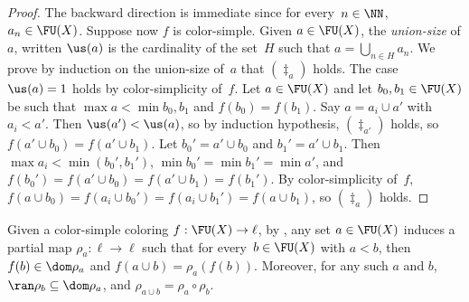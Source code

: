 \documentclass{article}
\numberwithin{theorem}{section}
\newtheorem{lemma}[theorem]{Lemma}
\begin{document}
\begin{proof}
The backward direction is immediate since for every~$n \in \NN$, $a_n \in \FU(X)$.
Suppose now $f$ is color-simple. Given $a \in \FU(X)$, the \emph{union-size} of $a$, written $\us(a)$ is the cardinality of the set~$H$ such that $a = \bigcup_{n \in H} a_n$. We prove by induction on the union-size of~$a$ that $(\ddagger_{a})$ holds. The case $\us(a) = 1$ holds by color-simplicity of~$f$. Let $a \in \FU(X)$ and let $b_0, b_1 \in \FU(X)$ be such that $\max a < \min b_0, b_1$ and $f(b_0) = f(b_1)$. Say $a = a_i \cup a'$ with $a_i < a'$.
Then $\us(a') < \us(a)$, so by induction hypothesis, $(\ddagger_{a'})$ holds, so $f(a' \cup b_0) = f(a' \cup b_1)$.
Let $b_0' = a' \cup b_0$ and $b_1' = a' \cup b_1$. Then $\max a_i < \min(b_0', b_1')$, $\min b_0' = \min b_1' = \min a'$, and $f(b_0') = f(a' \cup b_0) = f(a' \cup b_1) = f(b_1')$. By color-simplicity of~$f$, $f(a \cup b_0) = f(a_i \cup b_0') = f(a_i \cup b_1') = f(a \cup b_1)$, so $(\ddagger_a)$ holds. 
\end{proof}

Given a color-simple coloring $f : \FU(X) \to \ell$, by , any set $a \in \FU(X)$ induces a partial map $\rho_a : \ell \to \ell$ such that for every~$b \in \FU(X)$ with $a < b$, then $f(b) \in \dom \rho_a$ and $f(a \cup b) = \rho_a(f(b))$. Moreover, for any such $a$ and $b$, $\ran \rho_b \subseteq \dom \rho_a$, and $\rho_{a \cup b} = \rho_a \circ \rho_b$.
\end{document}

